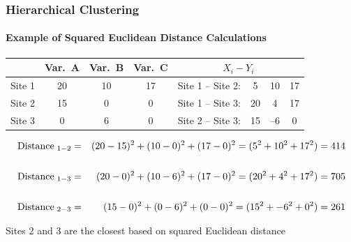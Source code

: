 \documentclass[10pt]{beamer}
\begin{document}
\begin{frame}
\frametitle{Hierarchical Clustering}
\framesubtitle{Example of Squared Euclidean Distance Calculations}

\begin{center}
\begin{tabular}{|l|ccc||lccc|} \hline
	& Var.~A	& Var.~B	& Var.~C		& \multicolumn{4}{||c|}{$X_{i} - Y_{i}$} \\ \hline
Site 1	& 20	& 10	& 17		& Site 1 -- Site 2: 	& 5		& 10		& 17\\
Site 2	& 15	& 0	& 0		& Site 1 -- Site 3:	& 20		& 4		& 17\\
Site 3	& 0	& 6	& 0		& Site 2 -- Site 3:	& 15		& --6		& 0\\ \hline
\end{tabular}
\end{center}


{\scriptsize
\begin{eqnarray*}
{\rm Distance\;}_{1-2} & = & (20-15)^{2} + (10-0)^{2} + (17-0)^{2} = (5^{2} + 10^{2} + 17^{2}) = 414\\
		&	& \\
{\rm Distance\;}_{1-3} & = & (20-0)^{2} + (10-6)^{2} + (17-0)^{2} = (20^{2} + 4^{2} + 17^{2}) = 705\\
		&	& \\
{\rm Distance\;}_{2-3} & = & (15-0)^{2} + (0-6)^{2} + (0-0)^{2} = (15^{2} + -6^{2} + 0^{2}) = 261
\end{eqnarray*}

\color{blue} Sites 2 and 3 are the closest based on squared Euclidean distance
}
\end{frame}
\end{document}
